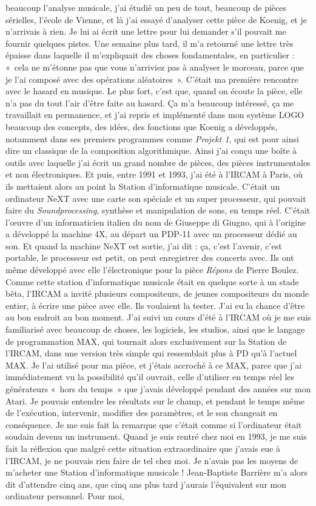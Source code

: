\documentclass[a4paper,12pt]{article}
\newcommand{\guill}[1]{«~#1~»}
\begin{document}
beaucoup l'analyse musicale, j'ai étudié un peu de tout, beaucoup de pièces sérielles, l'école de Vienne, et là j'ai essayé d'analyser cette pièce de Koenig, et je n'arrivais à rien. Je lui ai écrit une lettre pour lui demander s'il pouvait me fournir quelques pistes. Une semaine plus tard, il m'a retourné une lettre très épaisse dans laquelle il m'expliquait des choses fondamentales, en particulier : \guill{cela ne m'étonne pas que vous n'arriviez pas à analyser le morceau, parce que je l'ai composé avec des opérations aléatoires}. C'était ma première rencontre avec le hasard en musique. Le plus fort, c'est que, quand on écoute la pièce, elle n'a pas du tout l'air d'être faite au hasard. Ça m'a beaucoup intéressé, ça me travaillait en permanence, et j'ai repris et implémenté dans mon système LOGO beaucoup des concepts, des idées, des fonctions que Koenig a développés, notamment dans ses premiers programmes comme \emph{Projekt 1}, qui est pour ainsi dire un classique de la composition algorithmique. Ainsi j'ai conçu une boîte à outils avec laquelle j'ai écrit un grand nombre de pièces, des pièces instrumentales et non électroniques. Et puis, entre 1991 et 1993, j'ai été à l'IRCAM à Paris, où ils mettaient alors au point la Station d'informatique musicale. C'était un ordinateur NeXT avec une carte son spéciale et un super processeur, qui pouvait faire du \emph{Soundprocessing}, synthèse et manipulation de sons, en temps réel. C'était l'œuvre d'un informaticien italien du nom de Giuseppe di Giugno, qui à l'origine a développé la machine 4X, au départ un PDP-11 avec un processeur dédié au son. Et quand la machine NeXT est sortie, j'ai dit : ça, c'est l'avenir, c'est portable, le processeur est petit, on peut enregistrer des concerts avec. Ils ont même développé avec elle l'électronique pour la pièce \emph{Répons} de Pierre Boulez. Comme cette station d'informatique musicale était en quelque sorte à un stade bêta, l'IRCAM a invité plusieurs compositeurs, de jeunes compositeurs du monde entier, à écrire une pièce avec elle. Ils voulaient la tester. J'ai eu la chance d'être au bon endroit au bon moment. J'ai suivi un cours d'été à l'IRCAM où je me suis familiarisé avec beaucoup de choses, les logiciels, les studios, ainsi que le langage de programmation MAX, qui tournait alors exclusivement sur la Station de l'IRCAM, dans une version très simple qui ressemblait plus à PD qu'à l'actuel MAX. Je l'ai utilisé pour ma pièce, et j'étais accroché à ce MAX, parce que j'ai immédiatement vu la possibilité qu'il ouvrait, celle d'utiliser en temps réel les générateurs \guill{hors du temps} que j'avais développé pendant des années sur mon Atari. Je pouvais entendre les résultats sur le champ, et pendant le temps même de l'exécution, intervenir, modifier des paramètres, et le son changeait en conséquence. Je me suis fait la remarque que c'était comme si l'ordinateur était soudain devenu un instrument. Quand je suis rentré chez moi en 1993, je me suis fait la réflexion que malgré cette situation extraordinaire que j'avais eue à l'IRCAM, je ne pouvais rien faire de tel chez moi. Je n'avais pas les moyens de m'acheter une Station d'informatique musicale ! Jean-Baptiste Barrière m'a alors dit d'attendre cinq ans, que cinq ans plus tard j'aurais l'équivalent sur mon ordinateur personnel. Pour moi, 
\end{document}

